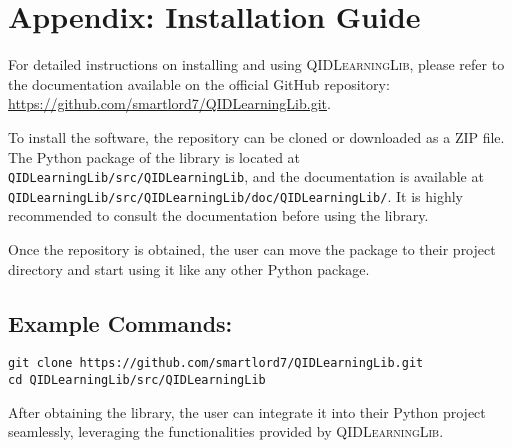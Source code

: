 \documentclass[twoside,11pt]{article}
\begin{document}

\clearpage
\appendix
\section*{Appendix: Installation Guide}
For detailed instructions on installing and using \textsc{QIDLearningLib}, please refer to the documentation available on the official GitHub repository: \url{https://github.com/smartlord7/QIDLearningLib.git}.

To install the software, the repository can be cloned or downloaded as a ZIP file. The Python package of the library is located at \texttt{QIDLearningLib/src/QIDLearningLib}, and the documentation is available at \texttt{QIDLearningLib/src/QIDLearningLib/doc/QIDLearningLib/}. It is highly recommended to consult the documentation before using the library.

Once the repository is obtained, the user can move the package to their project directory and start using it like any other Python package.

\subsection*{Example Commands:}
\begin{verbatim}
git clone https://github.com/smartlord7/QIDLearningLib.git
cd QIDLearningLib/src/QIDLearningLib
\end{verbatim}

After obtaining the library, the user can integrate it into their Python project seamlessly, leveraging the functionalities provided by \textsc{QIDLearningLib}.
\end{document}
